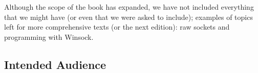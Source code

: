 Although the scope of the book has expanded, we have not included
everything that we might have (or even that we were asked to include);
examples of topics left for more comprehensive texts (or the
next edition): raw sockets and programming with Winsock.



\subsection*{Intended Audience}

